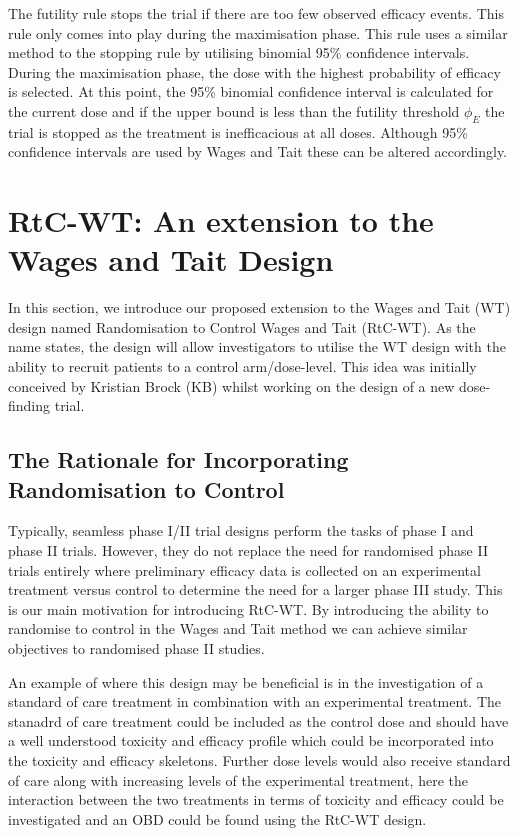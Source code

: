 The futility rule stops the trial if there are too few observed efficacy events. This rule only comes into play during the maximisation phase. This rule uses a similar method to the stopping rule by utilising binomial 95\% confidence intervals. During the maximisation phase, the dose with the highest probability of efficacy is selected. At this point, the 95\% binomial confidence interval is calculated for the current dose and if the upper bound is less than the futility threshold $\phi_E$ the trial is stopped as the treatment is inefficacious at all doses. Although 95\% confidence intervals are used by Wages and Tait these can be altered accordingly. 


\section{RtC-WT: An extension to the Wages and Tait Design}
\label{WT:RtC-WT}

In this section, we introduce our proposed extension to the Wages and Tait (WT) design named Randomisation to Control Wages and Tait (RtC-WT). As the name states, the design will allow investigators to utilise the WT design with the ability to recruit patients to a control arm/dose-level. This idea was initially conceived by Kristian Brock (KB) whilst working on the design of a new dose-finding trial.  

\subsection{The Rationale for Incorporating Randomisation to Control}
\label{WT:Rationale-for-RtC-WT}

Typically, seamless phase \RN{1}/\RN{2} trial designs perform the tasks of phase \RN{1} and phase \RN{2} trials. However, they do not replace the need for randomised phase \RN{2} trials entirely where preliminary efficacy data is collected on an experimental treatment versus control to determine the need for a larger phase \RN{3} study. This is our main motivation for introducing RtC-WT. By introducing the ability to randomise to control in the Wages and Tait method we can achieve similar objectives to randomised phase \RN{2} studies. 

An example of where this design may be beneficial is in the investigation of a standard of care treatment in combination with an experimental treatment. The stanadrd of care treatment could be included as the control dose and should have a well understood toxicity and efficacy profile which could be incorporated into the toxicity and efficacy skeletons. Further dose levels would also receive standard of care along with increasing levels of the experimental treatment, here the interaction between the two treatments in terms of toxicity and efficacy could be investigated and an OBD could be found using the RtC-WT design. 

